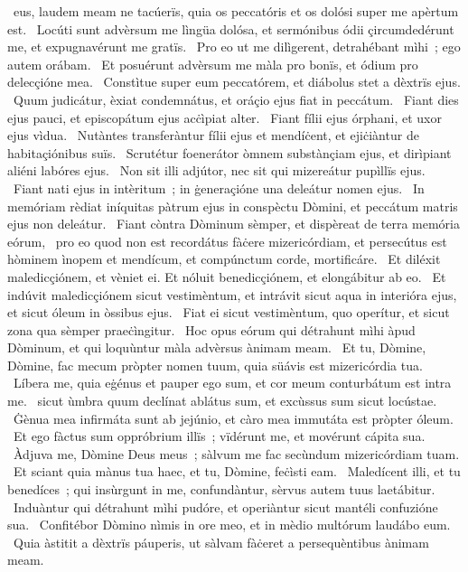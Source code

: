 \psalmChapterWithInscription{}
{ }
{%
~eus, laudem meam ne tacúerïs, quia os peccatóris et os dolósi super me apèrtum est. 
~Locúti sunt advèrsum me lìngüa dolósa, et sermónibus ódii çircumdedérunt me, et expugnavérunt me gratïs. 
~Pro eo ut me dilìgerent, detrahébant mìhi~; ego autem orábam. 
~Et posuérunt advèrsum me màla pro bonïs, et ódium pro delecçióne mea. 
~Constìtue super eum peccatórem, et diábolus stet a dèxtrïs ejus. 
~Quum judicátur, èxiat condemnátus, et oráçio ejus fiat in peccátum. 
~Fiant dies ejus pauci, et episcopátum ejus acċìpiat alter. 
~Fiant fílii ejus órphani, et uxor ejus vìdua. 
~Nutàntes transferàntur fílii ejus et mendíċent, et ejiċiàntur de habitaçiónibus suïs. 
~Scrutétur foenerátor òmnem substànçiam ejus, et dirìpiant aliéni labóres ejus. 
~Non sit illi adjútor, nec sit qui mizereátur pupìllïs ejus. 
~Fiant nati ejus in intèritum~; in ġeneraçióne una deleátur nomen ejus. 
~In memóriam rèdiat iníquitas pàtrum ejus in conspèctu Dòmini, et peccátum matris ejus non deleátur. 
~Fiant còntra Dòminum sèmper, et dispèreat de terra memória eórum, 
~pro eo quod non est recordátus fàċere mizericórdiam, et persecútus est hòminem ìnopem et mendícum, et compúnctum corde, mortificáre. 
~Et diléxit maledicçiónem, et vèniet ei. Et nóluit benedicçiónem, et elongábitur ab eo. 
~Et indúvit maledicçiónem sicut vestimèntum, et intrávit sicut aqua in interióra ejus, et sicut óleum in òssibus ejus. 
~Fiat ei sicut vestimèntum, quo operítur, et sicut zona qua sèmper praeċìngitur. 
~Hoc opus eórum qui détrahunt mìhi àpud Dòminum, et qui loquùntur màla advèrsus ànimam meam. 
~Et tu, Dòmine, Dòmine, fac mecum pròpter nomen tuum, quia süávis est mizericórdia tua. 
~Líbera me, quia eġénus et pauper ego sum, et cor meum conturbátum est intra me. 
~sicut ùmbra quum declínat ablátus sum, et excùssus sum sicut locústae. 
~Ġènua mea infirmáta sunt ab jejúnio, et càro mea immutáta est pròpter óleum. 
~Et ego fàctus sum oppróbrium illïs~; vïdérunt me, et movérunt cápita sua. 
~Àdjuva me, Dòmine Deus meus~; sàlvum me fac secùndum mizericórdiam tuam. 
~Et sciant quia mànus tua haec, et tu, Dòmine, feċìsti eam. 
~Maledícent illi, et tu benedíces~; qui insùrgunt in me, confundàntur, sèrvus autem tuus laetábitur. 
~Induàntur qui détrahunt mìhi pudóre, et operiàntur sicut mantéli confuzióne sua. 
~Confitébor Dòmino nìmis in ore meo, et in mèdio multórum laudábo eum. 
~Quia àstitit a dèxtrïs páuperis, ut sàlvam fàċeret a persequèntibus ànimam meam. 
}

